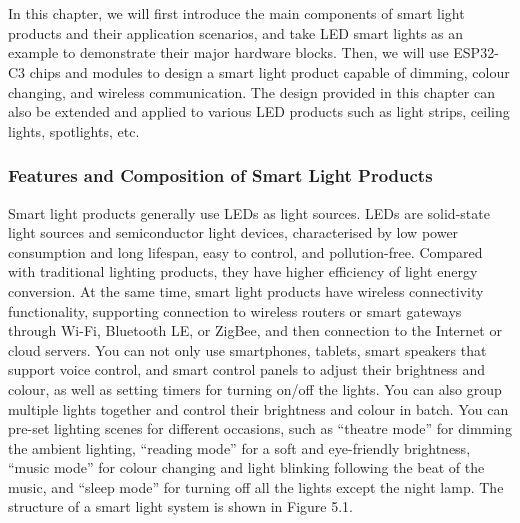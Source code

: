 \documentclass[a4paper,12pt]{book}
\begin{document}

{\makeatletter
\let\ps@plain\ps@empty
\makeatother
\part[Hardware and Driver Development]{}
}

\chapter[Hardware Design of Smart Light Products based on ESP32-C3]{}

\vspace{36pt}
In this chapter, we will first introduce the main components of smart light products and their application scenarios, and take LED smart lights as an example to demonstrate their major hardware blocks. Then, we will use ESP32-C3 chips and modules to design a smart light product capable of dimming, colour changing, and wireless communication. The design provided in this chapter can also be extended and applied to various LED products such as light strips, ceiling lights, spotlights, etc.

\section{Features and Composition of Smart Light Products}
Smart light products generally use LEDs as light sources. LEDs are solid-state light sources and semiconductor light devices, characterised by low power consumption and long lifespan, easy to control, and pollution-free. Compared with traditional lighting products, they have higher efficiency of light energy conversion. At the same time, smart light products have wireless connectivity functionality, supporting connection to wireless routers or smart gateways through Wi-Fi, Bluetooth LE, or ZigBee, and then connection to the Internet or cloud servers. You can not only use smartphones, tablets, smart speakers that support voice control, and smart control panels to adjust their brightness and colour, as well as setting timers for turning on/off the lights. You can also group multiple lights together and control their brightness and colour in batch. You can pre-set lighting scenes for different occasions, such as “theatre mode” for dimming the ambient lighting, “reading mode” for a soft and eye-friendly brightness, “music mode” for colour changing and light blinking following the beat of the music, and “sleep mode” for turning off all the lights except the night lamp. The structure of a smart light system is shown in Figure 5.1.
\end{document}
